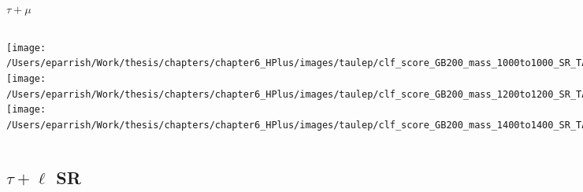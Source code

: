 \documentclass[aspectratio=169,xcolor=table]{beamer}
\begin{document}
    \begin{frame}[t]{$\tau+\mu$}
      \begin{columns}[t]
          \texttt{[image: /Users/eparrish/Work/thesis/chapters/chapter6\_HPlus/images/taulep/clf\_score\_GB200\_mass\_1000to1000\_SR\_TAUMU.png]}
          \texttt{[image: /Users/eparrish/Work/thesis/chapters/chapter6\_HPlus/images/taulep/clf\_score\_GB200\_mass\_1200to1200\_SR\_TAUMU.png]}
          \texttt{[image: /Users/eparrish/Work/thesis/chapters/chapter6\_HPlus/images/taulep/clf\_score\_GB200\_mass\_1400to1400\_SR\_TAUMU.png]}

          \texttt{[image: /Users/eparrish/Work/thesis/chapters/chapter6\_HPlus/images/taulep/clf\_score\_GB200\_mass\_1600to1600\_SR\_TAUMU.png]}
          \texttt{[image: /Users/eparrish/Work/thesis/chapters/chapter6\_HPlus/images/taulep/clf\_score\_GB200\_mass\_1800to1800\_SR\_TAUMU.png]}
          \texttt{[image: /Users/eparrish/Work/thesis/chapters/chapter6\_HPlus/images/taulep/clf\_score\_GB200\_mass\_2000to2000\_SR\_TAUMU.png]}

          \texttt{[image: /Users/eparrish/Work/thesis/chapters/chapter6\_HPlus/images/taulep/clf\_score\_GB200\_mass\_2500to2500\_SR\_TAUMU.png]}
          \texttt{[image: /Users/eparrish/Work/thesis/chapters/chapter6\_HPlus/images/taulep/clf\_score\_GB200\_mass\_3000to3000\_SR\_TAUMU.png]}


      \end{columns}
    \end{frame}

  \subsection{$\tau+\ell$ SR}
\end{document}
